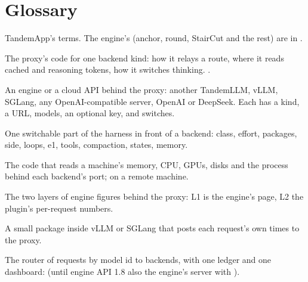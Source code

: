 \chapter{Glossary}\label{ch:glossary}

TandemApp's terms. The engine's (anchor, round, StairCut and the rest) are in .

\begin{description}[style=unboxed, leftmargin=0pt, itemsep=.5ex, font=\normalfont\bfseries]

\item[adapter] The proxy's code for one backend kind: how it relays a route, where it reads cached and reasoning tokens, how it switches thinking. .

\item[backend] An engine or a cloud API behind the proxy: another TandemLLM, vLLM, SGLang, any OpenAI-compatible server, OpenAI or DeepSeek. Each has a kind, a URL, models, an optional key, and switches.

\item[feature group] One switchable part of the harness in front of a backend: class, effort, packages, side, loops, e1, tools, compaction, states, memory.

\item[host collector] The code that reads a machine's memory, CPU, GPUs, disks and the process behind each backend's port;  on a remote machine.

\item[L1, L2] The two layers of engine figures behind the proxy: L1 is the engine's  page, L2 the plugin's per-request numbers.

\item[plugin] A small package inside vLLM or SGLang that posts each request's own times to the proxy.

\item[proxy] The router of requests by model id to backends, with one ledger and one dashboard:  (until engine API 1.8 also the engine's server with ).

\end{description}
